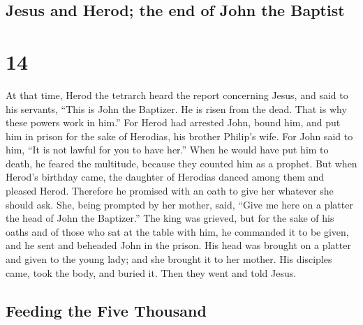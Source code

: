 \hypertarget{jesus-and-herod-the-end-of-john-the-baptist}{%
\subsection{Jesus and Herod; the end of John the
Baptist}\label{jesus-and-herod-the-end-of-john-the-baptist}}

\hypertarget{section-13}{%
\section{14}\label{section-13}}

 At that time, Herod the tetrarch heard the report
concerning Jesus,  and said to his servants, ``This is
John the Baptizer. He is risen from the dead. That is why these powers
work in him.''  For Herod had arrested John, bound him,
and put him in prison for the sake of Herodias, his brother Philip's
wife.  For John said to him, ``It is not lawful for you to
have her.''  When he would have put him to death, he
feared the multitude, because they counted him as a prophet.
 But when Herod's birthday came, the daughter of Herodias
danced among them and pleased Herod.  Therefore he
promised with an oath to give her whatever she should ask.
 She, being prompted by her mother, said, ``Give me here
on a platter the head of John the Baptizer.''  The king
was grieved, but for the sake of his oaths and of those who sat at the
table with him, he commanded it to be given,  and he sent
and beheaded John in the prison.  His head was brought on
a platter and given to the young lady; and she brought it to her mother.
 His disciples came, took the body, and buried it. Then
they went and told Jesus.

\hypertarget{feeding-the-five-thousand}{%
\subsection{Feeding the Five Thousand}\label{feeding-the-five-thousand}}

